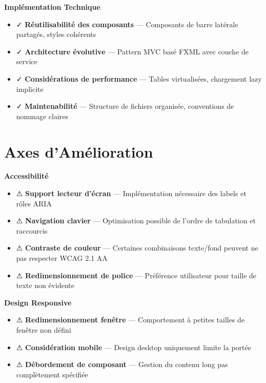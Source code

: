 \documentclass[12pt, a4paper]{report}
\begin{document}
\begin{keypoint}
\textbf{Implémentation Technique}
\begin{itemize}
    \item ✓ \textbf{Réutilisabilité des composants} --- Composants de barre latérale partagés, styles cohérents
    \item ✓ \textbf{Architecture évolutive} --- Pattern MVC basé FXML avec couche de service
    \item ✓ \textbf{Considérations de performance} --- Tables virtualisées, chargement lazy implicite
    \item ✓ \textbf{Maintenabilité} --- Structure de fichiers organisée, conventions de nommage claires
\end{itemize}
\end{keypoint}

\section{Axes d'Amélioration}

\begin{warningbox}
\textbf{Accessibilité}
\begin{itemize}
    \item ⚠ \textbf{Support lecteur d'écran} --- Implémentation nécessaire des labels et rôles ARIA
    \item ⚠ \textbf{Navigation clavier} --- Optimisation possible de l'ordre de tabulation et raccourcis
    \item ⚠ \textbf{Contraste de couleur} --- Certaines combinaisons texte/fond peuvent ne pas respecter WCAG 2.1 AA
    \item ⚠ \textbf{Redimensionnement de police} --- Préférence utilisateur pour taille de texte non évidente
\end{itemize}
\end{warningbox}

\begin{warningbox}
\textbf{Design Responsive}
\begin{itemize}
    \item ⚠ \textbf{Redimensionnement fenêtre} --- Comportement à petites tailles de fenêtre non défini
    \item ⚠ \textbf{Considération mobile} --- Design desktop uniquement limite la portée
    \item ⚠ \textbf{Débordement de composant} --- Gestion du contenu long pas complètement spécifiée
\end{itemize}
\end{warningbox}
\end{document}
